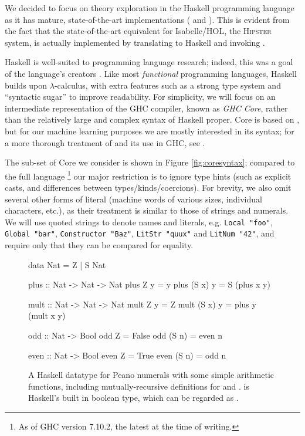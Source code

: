 We decided to focus on theory exploration in the Haskell programming language as
it has mature, state-of-the-art implementations (\qspec{} \cite{QuickSpec} and
\hspec{} \cite{claessen2013automating}). This is evident from the fact that the
state-of-the-art equivalent for Isabelle/HOL, the \textsc{Hipster}
\cite{Hipster} system, is actually implemented by translating to Haskell and
invoking \hspec{}.

Haskell is well-suited to programming language research; indeed, this was a goal
of the language's creators \cite{marlow2010haskell}. Like most
\emph{functional} programming languages, Haskell builds upon $\lambda$-calculus,
with extra features such as a strong type system and ``syntactic sugar'' to
improve readability. For simplicity, we will focus on an intermediate
representation of the \textsc{GHC} compiler, known as \emph{GHC Core}, rather
than the relatively large and complex syntax of Haskell proper. Core is based on
\fc{}, but for our machine learning purposes we are mostly interested in its
syntax; for a more thorough treatment of \fc{} and its use in GHC, see
\cite[Appendix C]{sulzmann2007system}.

The sub-set of Core we consider is shown in Figure \ref{fig:coresyntax};
compared to the full language \footnote{As of GHC version 7.10.2, the latest at
  the time of writing.} our major restriction is to ignore type hints (such as
explicit casts, and differences between types/kinds/coercions). For brevity, we
also omit several other forms of literal (machine words of various sizes,
individual characters, etc.), as their treatment is similar to those of strings
and numerals. We will use quoted strings to denote names and literals,
e.g. \texttt{Local "foo"}, \texttt{Global "bar"}, \texttt{Constructor "Baz"},
\texttt{LitStr "quux"} and \texttt{LitNum "42"}, and require only that they can
be compared for equality.

\begin{figure}
  \begin{haskell}
    data Nat = Z
             | S Nat

    plus :: Nat -> Nat -> Nat
    plus    Z  y = y
    plus (S x) y = S (plus x y)

    mult :: Nat -> Nat -> Nat
    mult    Z  y = Z
    mult (S x) y = plus y (mult x y)

    odd :: Nat -> Bool
    odd    Z  = False
    odd (S n) = even n

    even :: Nat -> Bool
    even    Z  = True
    even (S n) = odd n
  \end{haskell}
  \caption{A Haskell datatype for Peano numerals with some simple arithmetic
    functions, including mutually-recursive definitions for  and
    .  is Haskell's built in boolean type, which can be
    regarded as .}
  \label{fig:haskellexample}
\end{figure}

